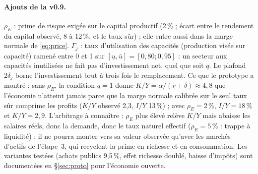 \documentclass[11pt,a4paper]{article}
\begin{document}
\begin{lecture}
\paragraph{Ajouts de la v0.9.} $\rho_E$ : prime de risque exigée sur le capital productif (2\,\% ; écart entre le rendement du capital observé, 8 à 12\,\%, et le taux sûr) ; elle entre aussi dans la marge normale de \eqref{eq:price}. $\Gamma_j$ : taux d'utilisation des capacités (production visée sur capacité) ramené entre 0 et 1 sur $[\underline u,\bar u]=[0{,}80 ; 0{,}95]$ : un secteur aux capacités inutilisées ne fait pas d'investissement net, quel que soit $q$. Le plafond $2\delta_j$ borne l'investissement brut à trois fois le remplacement. Ce que le prototype a montré : sans $\rho_E$, la condition $q=1$ donne $K/Y=\alpha/(r+\delta)\approx4{,}8$ que l'économie n'atteint jamais parce que la marge normale calibrée sur le seul taux sûr comprime les profits ($K/Y$ observé 2,3, $I/Y$ 13\,\%) ; avec $\rho_E=2\,\%$, $I/Y=18\,\%$ et $K/Y=2{,}9$. L'arbitrage à connaître : $\rho_E$ plus élevé relève $K/Y$ mais abaisse les salaires réels, donc la demande, donc le taux naturel effectif ($\rho_E=5\,\%$ : trappe à liquidité) ; il ne pourra monter vers sa valeur observée qu'avec les marchés d'actifs de l'étape~3, qui recyclent la prime en richesse et en consommation. Les variantes testées (achats publics 9,5\,\%, effet richesse doublé, baisse d'impôts) sont documentées en \S\ref{sec:proto} pour l'économie ouverte.

\end{lecture}
\end{document}
